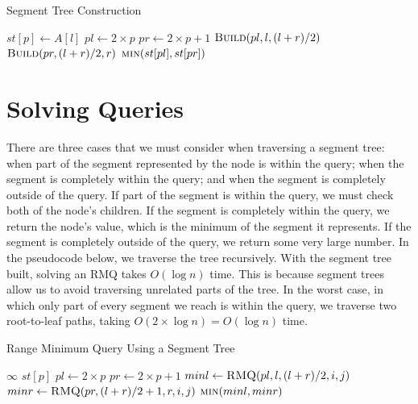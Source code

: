 \documentclass[11pt]{article}
\begin{document}
\begin{algorithm}[H]
\caption{Segment Tree Construction}
\begin{algorithmic}
            \State $st[p] \gets A[l]$
        \Else
            \State $pl \gets 2 \times p$
            \State $pr \gets 2 \times p + 1$
            \State $\Call{Build}{pl, l, (l + r) / 2}$
            \State $\Call{Build}{pr, (l + r) / 2, r}$
            \State \Return $\Call{min}{st[pl], st[pr]}$
        \EndIf
    \EndFunction
\end{algorithmic}
\end{algorithm}

\section{Solving Queries}

There are three cases that we must consider when traversing a segment tree: when part of the segment represented by the node is within the query; when the segment is completely within the query; and when the segment is completely outside of the query. If part of the segment is within the query, we must check both of the node's children. If the segment is completely within the query, we return the node's value, which is the minimum of the segment it represents. If the segment is completely outside of the query, we return some very large number. In the pseudocode below, we traverse the tree recursively. With the segment tree built, solving an RMQ takes $O(\log n)$ time. This is because segment trees allow us to avoid traversing unrelated parts of the tree. In the worst case, in which only part of every segment we reach is within the query, we traverse two root-to-leaf paths, taking $O(2 \times \log n) = O(\log n)$ time.

\begin{algorithm}[H]
\caption{Range Minimum Query Using a Segment Tree}
\begin{algorithmic}
            \State \Return $\infty$
        \EndIf
            \State \Return $st[p]$
        \EndIf
        \State $pl \gets 2 \times p$
        \State $pr \gets 2 \times p + 1$
        \State $minl \gets \Call{RMQ}{pl, l, (l + r) / 2, i, j}$
        \State $minr \gets \Call{RMQ}{pr, (l + r) / 2 + 1, r, i, j}$
        \State \Return $\Call{min}{minl, minr}$
    \EndFunction
\end{algorithmic}
\end{algorithm}
\end{document}
